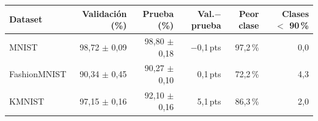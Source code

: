 \begin{tabular}{lrrrrr}
\toprule
Dataset & Validación (\%) & Prueba (\%) & Val.$-$prueba & Peor clase & Clases $<$ 90\,\% \\
\midrule
MNIST & 98,72 $\pm$ 0,09 & 98,80 $\pm$ 0,18 & $-$0,1\,pts & 97,2\,\% & 0,0 \\
FashionMNIST & 90,34 $\pm$ 0,45 & 90,27 $\pm$ 0,10 & 0,1\,pts & 72,2\,\% & 4,3 \\
KMNIST & 97,15 $\pm$ 0,16 & 92,10 $\pm$ 0,16 & 5,1\,pts & 86,3\,\% & 2,0 \\
\bottomrule
\end{tabular}
